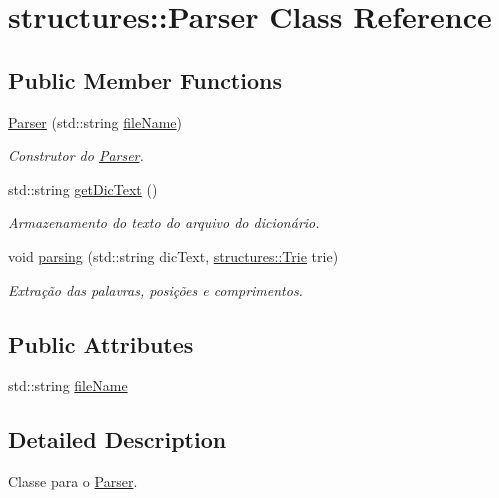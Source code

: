 \hypertarget{classstructures_1_1Parser}{}\section{structures\+:\+:Parser Class Reference}
\label{classstructures_1_1Parser}
\subsection*{Public Member Functions}
\begin{DoxyCompactItemize}
\item 
\hyperlink{classstructures_1_1Parser_a62344223eabcf9cd5e2cf6f6b5ea2139}{Parser} (std\+::string \hyperlink{classstructures_1_1Parser_ac5ccd294f3176bcac3f1de2045e523ef}{file\+Name})
\begin{DoxyCompactList}\small\item\em Construtor do \hyperlink{classstructures_1_1Parser}{Parser}. \end{DoxyCompactList}\item 
std\+::string \hyperlink{classstructures_1_1Parser_a0c3fe341a7d74b1db953cc19eeba7062}{get\+Dic\+Text} ()
\begin{DoxyCompactList}\small\item\em Armazenamento do texto do arquivo do dicionário. \end{DoxyCompactList}\item 
void \hyperlink{classstructures_1_1Parser_a4cab45335029ece42ba0d79263621ace}{parsing} (std\+::string dic\+Text, \hyperlink{classstructures_1_1Trie}{structures\+::\+Trie} trie)
\begin{DoxyCompactList}\small\item\em Extração das palavras, posições e comprimentos. \end{DoxyCompactList}\end{DoxyCompactItemize}
\subsection*{Public Attributes}
\begin{DoxyCompactItemize}
\item 
std\+::string \hyperlink{classstructures_1_1Parser_ac5ccd294f3176bcac3f1de2045e523ef}{file\+Name}
\end{DoxyCompactItemize}


\subsection{Detailed Description}
Classe para o \hyperlink{classstructures_1_1Parser}{Parser}. 

